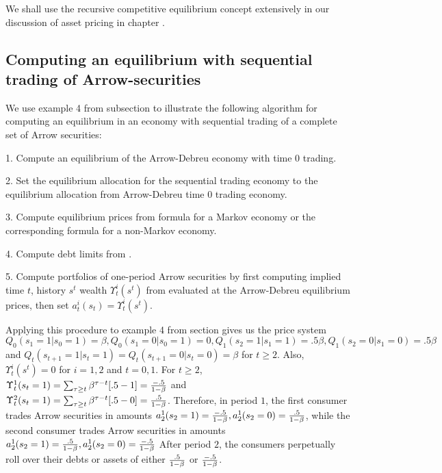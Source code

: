 We shall use the recursive competitive equilibrium concept
extensively in our discussion of asset pricing in chapter .

\subsection{Computing an equilibrium with sequential trading of  Arrow-securities}\label{sec:example4cont}%
We use example 4 from subsection  to illustrate the following algorithm for computing an
equilibrium in an economy with sequential trading of a complete set of Arrow securities:

\medskip
\item {1.}  Compute an equilibrium of the Arrow-Debreu economy with time $0$ trading.
\medskip
\item {2.} Set the equilibrium allocation for the sequential trading economy to  the equilibrium allocation from Arrow-Debreu
time $0$ trading economy.
\medskip
\item {3.} Compute equilibrium prices from  formula  for a Markov economy
or the corresponding formula  for a non-Markov economy.
\medskip
\item{4.} Compute debt limits from .
\medskip
\item {5.}  Compute portfolios of one-period Arrow securities  by first computing implied time $t$, history $s^t$ wealth
$\Upsilon^i_t(s^t) $ from  evaluated at the Arrow-Debreu equilibrium prices,
then set $a_t^i(s_t) = \Upsilon^i_t(s^t)$.

\medskip

Applying this procedure to example 4 from section  gives us
the price system $Q_0(s_1=1| s_0=1) =\beta, Q_0(s_1=0|s_0=1) =0, Q_1(s_2=1|s_1=1) = .5 \beta, Q_1(s_2=0|s_1=0) = .5 \beta$  and
$Q_t(s_{t+1} = 1| s_t =1) = Q_t(s_{t+1} = 0| s_t =0) = \beta $ for $t \geq 2$.
Also, $\Upsilon^i_t(s^t) = 0$ for $i=1,2$ and $t=0,1$.  For $t \geq 2$,
$\Upsilon_t^1 (s_t =1)= \sum_{\tau \geq t} \beta^{\tau - t}[.5 -1] = {-.5 \over 1-\beta}$ and
$\Upsilon_t^2(s_t=1) = \sum_{\tau \geq t} \beta^{\tau - t}[.5 -0] = {.5 \over 1-\beta}$.
Therefore, in period $1$, the first  consumer trades Arrow securities in amounts $a_2^1(s_2=1) = {-.5 \over 1-\beta},
a_2^1(s_2 = 0) = {.5 \over 1-\beta}$, while the second consumer trades  Arrow securities in amounts $a_2^1(s_2=1) = {.5 \over 1-\beta},
a_2^1(s_2 = 0) = {-.5 \over 1-\beta}$   After period $2$, the consumers perpetually roll over their debts or assets of either
${.5 \over 1-\beta}$ or ${-.5 \over 1 - \beta}$.


